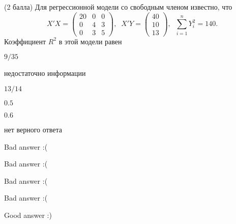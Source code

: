 
\begin{question}
(2 балла) Для регрессионной модели со свободным членом известно, что \[
X'X = \begin{pmatrix}
20 & 0 & 0 \\
0 & 4 & 3 \\
0 & 3 & 5
\end{pmatrix}, \; \;
X'Y = \begin{pmatrix}
40 \\
10 \\
13
\end{pmatrix}, \;\;
\sum_{i=1}^n Y_i^2 = 140.
\] Коэффициент \(R^2\) в этой модели равен
\begin{answerlist}
  \item \(9/35\)
  \item недостаточно информации
  \item \(13/14\)
  \item \(0.5\)
  \item \(0.6\)
  \item нет верного ответа
\end{answerlist}
\end{question}

\begin{solution}
\begin{answerlist}
  \item Bad answer :(
  \item Bad answer :(
  \item Bad answer :(
  \item Bad answer :(
  \item Good answer :)
\end{answerlist}
\end{solution}

